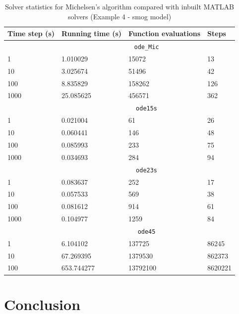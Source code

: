 \documentclass[letterpaper,12pt,onehalfspacing,twoside]{article}
\theoremstyle{msds}
\begin{document}
\begin{table}[H]
\centering
\caption{Solver statistics for Michelsen's algorithm compared with inbuilt MATLAB solvers (Example 4 - smog model)}
\label{tab:smog_stat}
\begin{tabular}{@{}llll@{}}
\toprule
Time step (s) & Running time (s) & Function evaluations & Steps   \\ \midrule
                    & \multicolumn{3}{c}{\texttt{ode\_Mic}} \\ \cmidrule(l){2-4} 
1        & 1.010029     & 15072                & 13      \\
10       & 3.025674     & 51496                & 42      \\
100      & 8.835829     & 158262               & 126     \\
1000     & 25.085625    & 456571               & 362     \\ \cmidrule(l){2-4} 
                    & \multicolumn{3}{c}{\texttt{ode15s}} \\ \cmidrule(l){2-4} 
1        & 0.021004     & 61                   & 26      \\
10       & 0.060441     & 146                  & 48      \\
100      & 0.085993     & 233                  & 75      \\
1000     & 0.034693     & 284                  & 94      \\ \cmidrule(l){2-4} 
                    & \multicolumn{3}{c}{\texttt{ode23s}} \\ \cmidrule(l){2-4} 
1        & 0.083637     & 252                  & 17      \\
10       & 0.057533     & 569                  & 38      \\
100      & 0.081612     & 914                  & 61      \\
1000     & 0.104977     & 1259                 & 84      \\ \cmidrule(l){2-4} 
                    & \multicolumn{3}{c}{\texttt{ode45}} \\ \cmidrule(l){2-4} 
1        & 6.104102     & 137725               & 86245   \\
10       & 67.269395    & 1379530              & 862373  \\
100      & 653.744277   & 13792100             & 8620221 \\ \bottomrule
\end{tabular}
\end{table}

\section{Conclusion}
\end{document}
